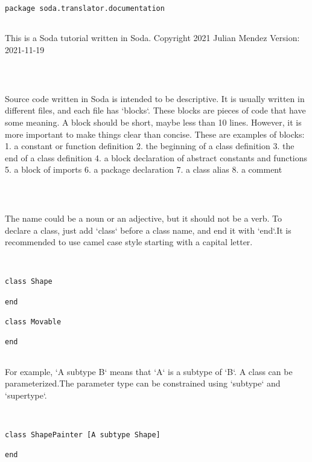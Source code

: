 \documentclass[12pt,a4paper]{article}
\begin{document}
\begin{lstlisting}
package soda.translator.documentation


\end{lstlisting}

This is a Soda tutorial written in Soda.
Copyright 2021 Julian Mendez
 Version: 2021-11-19


\begin{lstlisting}



\end{lstlisting}

Source code written in Soda is intended to be descriptive.
It is usually written in different files, and each file has `blocks`.
These blocks are pieces of code that have some meaning.
A block should be short, maybe less than 10 lines.
However, it is more important to make things clear than concise.
These are examples of blocks:
1. a constant or function definition
2. the beginning of a class definition
3. the end of a class definition
4. a block declaration of abstract constants and functions
5. a block of imports
6. a package declaration
7. a class alias
 8. a comment


\begin{lstlisting}



\end{lstlisting}

The name could be a noun or an adjective, but it should not be a verb. To declare a class, just add `class` before a class name, and end it with `end`.It is recommended to use camel case style starting with a capital letter.


\begin{lstlisting}


class Shape

end

class Movable

end


\end{lstlisting}

For example, `A subtype B` means that `A` is a subtype of `B`. A class can be parameterized.The parameter type can be constrained using `subtype` and `supertype`.


\begin{lstlisting}


class ShapePainter [A subtype Shape]

end


\end{lstlisting}
\end{document}

